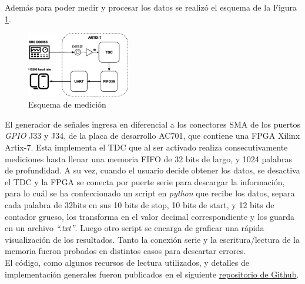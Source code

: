 Además para poder medir y procesar los datos se realizó el esquema de la Figura \ref{fig: esquema}.
\begin{figure}[H]
      \centering
      \includegraphics[width=0.4\textwidth]{imagenes/TDC-functional-blocks.eps}
      \caption{Esquema de medición}
      \label{fig: esquema}
\end{figure}
El generador de señales ingresa en diferencial a los conectores SMA de los puertos \textit{GPIO} J33 y J34, de la
placa de desarrollo AC701, que contiene una FPGA Xilinx Artix-7. Esta implementa el TDC que al ser activado
realiza consecutivamente mediciones hasta llenar una memoria FIFO de 32 bits de largo, y 1024 palabras de profundidad.
A su vez, cuando el usuario decide obtener los datos, se desactiva el TDC y la FPGA se conecta por puerte serie 
para descargar la información, para lo cuál se ha confeccionado un script en \textit{python} que recibe los datos,
separa cada palabra de 32bits en sus 10 bits de stop, 10 bits de start, y 12 bits de contador grueso, los
transforma en el valor decimal correspondiente y los guarda en un archivo \textit{``.txt''}. Luego otro script se encarga
de graficar una rápida visualización de los resultados. Tanto la conexión serie y la escritura/lectura de la memoria fueron
probados en distintos casos para descartar errores.\\

El código, como algunos recursos de lectura utilizados, y detalles de implementación generales fueron publicados en el
siguiente \href{https://github.com/Miquefil/TDC-in-Artix-7}{repositorio de Github}.


\clearpage
